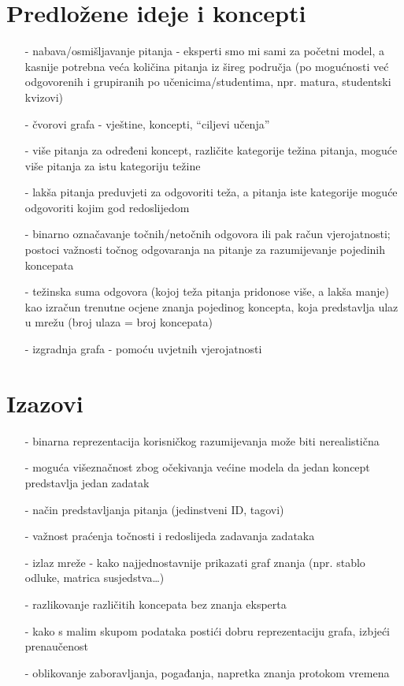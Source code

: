 \documentclass{report}
\begin{document}
\chapter{Predložene ideje i koncepti}
\begin{itemize}
\item[-]nabava/osmišljavanje pitanja - eksperti smo mi sami za početni model, a kasnije potrebna veća količina pitanja iz šireg područja (po mogućnosti već odgovorenih i grupiranih po učenicima/studentima, npr. matura, studentski kvizovi)
\item[-]čvorovi grafa - vještine, koncepti, “ciljevi učenja”
\item[-]više pitanja za određeni koncept, različite kategorije težina pitanja, moguće više pitanja za istu kategoriju težine
\item[-]lakša pitanja preduvjeti za odgovoriti teža, a pitanja iste kategorije moguće odgovoriti kojim god redoslijedom
\item[-]binarno označavanje točnih/netočnih odgovora ili pak račun vjerojatnosti; postoci važnosti točnog odgovaranja na pitanje za razumijevanje pojedinih koncepata
\item[-]težinska suma odgovora (kojoj teža pitanja pridonose više, a lakša manje) kao izračun trenutne ocjene znanja pojedinog koncepta, koja predstavlja ulaz u mrežu (broj ulaza = broj koncepata)
\item[-]izgradnja grafa - pomoću uvjetnih vjerojatnosti 
\end{itemize}

\chapter{Izazovi}
\begin{itemize}
\item[-]binarna reprezentacija korisničkog razumijevanja može biti nerealistična
\item[-]moguća višeznačnost zbog očekivanja većine modela da jedan koncept predstavlja jedan zadatak
\item[-]način predstavljanja pitanja (jedinstveni ID, tagovi) 
\item[-]važnost praćenja točnosti i redoslijeda zadavanja zadataka
\item[-]izlaz mreže - kako najjednostavnije prikazati graf znanja (npr. stablo odluke, matrica susjedstva…)
\item[-]razlikovanje različitih koncepata bez znanja eksperta
\item[-]kako s malim skupom podataka postići dobru reprezentaciju grafa, izbjeći prenaučenost
\item[-]oblikovanje zaboravljanja, pogađanja, napretka znanja protokom vremena
\end{itemize}
\end{document}
